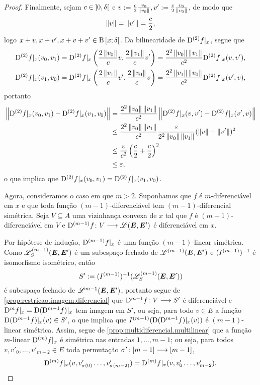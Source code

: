 \begin{proof}
Finalmente, sejam $c \in \left]{0},{\delta}\right[$ e $v := \frac{c}{2}\frac{v_0}{\left\Vert{v_0}\right\Vert}, v' := \frac{c}{2}\frac{v_0}{\left\Vert{v_0}\right\Vert}$, de modo que
	\begin{equation*}
	\left\Vert{v}\right\Vert = \left\Vert{v'}\right\Vert = \frac{c}{2},
	\end{equation*}
logo $x+v, x+v',x+v+v' \in \mathrm{B}\left[{x};{\delta}\right[$. Da bilinearidade de $\mathrm{D}^{(2)} f|_x$, segue que
	\begin{align*}
		\mathrm{D}^{(2)} f|_x(v_0,v_1) &= \mathrm{D}^{(2)} f|_x \left( \frac{2\left\Vert{v_0}\right\Vert}{c} v, \frac{2\left\Vert{v_1}\right\Vert}{c} v' \right) = \frac{2^2\left\Vert{v_0}\right\Vert\left\Vert{v_1}\right\Vert}{c^2} \mathrm{D}^{(2)} f|_x(v,v'), \\
		\mathrm{D}^{(2)} f|_x(v_1,v_0) &= \mathrm{D}^{(2)} f|_x \left( \frac{2\left\Vert{v_1}\right\Vert}{c} v', \frac{2\left\Vert{v_0}\right\Vert}{c} v \right) = \frac{2^2\left\Vert{v_1}\right\Vert\left\Vert{v_0}\right\Vert}{c^2} \mathrm{D}^{(2)} f|_x(v',v),
	\end{align*}
portanto
	\begin{align*}
	\left\Vert{\mathrm{D}^{(2)} f|_x(v_0,v_1) - \mathrm{D}^{(2)} f|_x(v_1,v_0)}\right\Vert &= \frac{2^2\left\Vert{v_0}\right\Vert\left\Vert{v_1}\right\Vert}{c^2}\left\Vert{\mathrm{D}^{(2)} f|_x(v,v') - \mathrm{D}^{(2)} f|_x(v',v)}\right\Vert \\
		&\leq \frac{2^2\left\Vert{v_0}\right\Vert\left\Vert{v_1}\right\Vert}{c^2} \frac{\varepsilon}{2^2\left\Vert{v_0}\right\Vert\left\Vert{v_1}\right\Vert} (\left\Vert{v}\right\Vert + \left\Vert{v'}\right\Vert)^2 \\
		&\leq \frac{\varepsilon}{c^2} \left( \frac{c}{2} + \frac{c}{2} \right)^2 \\
		&\leq \varepsilon,
	\end{align*}
o que implica que $\mathrm{D}^{(2)} f|_x(v_0,v_1) = \mathrm{D}^{(2)} f|_x(v_1,v_0)$.

Agora, consideramos o caso em que $m>2$. Suponhamos que $f$ é $m$-diferenciável em $x$ e que toda função $(m-1)$-diferenciável tem $(m-1)$-diferencial simétrica. Seja $V \subseteq A$ uma vizinhança convexa de $x$ tal que $f$ é $(m-1)$-diferenciável em $V$ e ${\mathrm{D}^{(m-1)} f}\colon {V} \longrightarrow {\mathscr{L}(\bm E, \bm E')}$ é diferenciável em $x$.

Por hipótese de indução, $\mathrm{D}^{(m-1)} f|_x$ é uma função $(m-1)$-linear simétrica. Como $\mathscr{L}_{S}^{(m-1)}(\bm E, \bm E')$ é um subespaço fechado de $\mathscr{L}^{(m-1)}(\bm E, \bm E')$ e $(I^{(m-1)})^{-1}$ é isomorfismo isométrico, então
	\begin{equation*}
	S' := (I^{(m-1)})^{-1}(\mathscr{L}_{S}^{(m-1)}(\bm E, \bm E'))
	\end{equation*}
é subespaço fechado de $\mathscr{L}^{m-1}(\bm E, \bm E')$, portanto segue de \ref{prop:restricao.imagem.diferencial} que ${\mathrm{D}^{m-1} f}\colon {V} \longrightarrow {S'}$ é diferenciável e $\mathrm{D}^m f|_x = \mathrm{D} (\mathrm{D}^{m-1} f)|_x$ tem imagem em $S'$, ou seja, para todo $v \in E$ a função $\mathrm{D} (\mathrm{D}^{m-1} f)|_x(v) \in S'$, o que implica que $I^{(m-1)}(\mathrm{D} (\mathrm{D}^{m-1} f)|_x(v))$ é $(m-1)$-linear simétrica. Assim, segue de \ref{prop:multidiferencial.multilinear} que a função $m$-linear $\mathrm{D}^{(m)} f|_x$ é simétrica nas entradas $1, \ldots, m-1$; ou seja, para todos $v, v'_0, \ldots, v'_{m-2} \in E$ toda permutação ${\sigma'}\colon {[m-1]} \longrightarrow {[m-1]}$,
	\begin{equation*}
	\mathrm{D}^{(m)} f|_x (v, v'_{\sigma(0)} \ldots, v'_{\sigma(m-2)}) = \mathrm{D}^{(m)} f|_x (v, v'_0 \ldots, v'_{m-2}).
	\end{equation*}


\end{proof}
